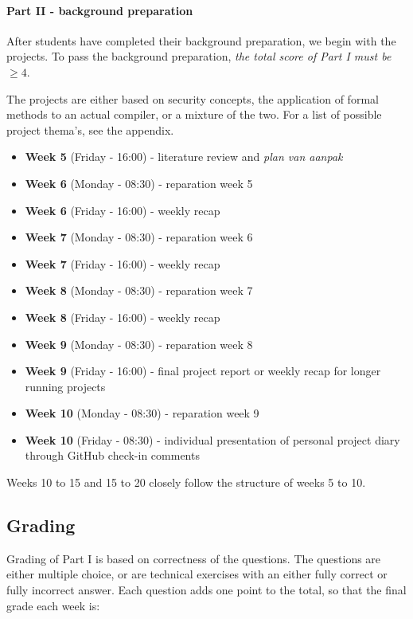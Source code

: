 		\paragraph*{Part II - background preparation}
			After students have completed their background preparation, we begin with the projects. To pass the background preparation, \textit{the total score of Part I must be $\geq 4$}.

			 The projects are either based on security concepts, the application of formal methods to an actual compiler, or a mixture of the two. For a list of possible project thema's, see the appendix.

			\begin{itemize}
				\item \textbf{Week 5} (Friday - 16:00) - literature review and \textit{plan van aanpak}
				\item \textbf{Week 6} (Monday - 08:30) - reparation week 5


				\item \textbf{Week 6} (Friday - 16:00) - weekly recap
				\item \textbf{Week 7} (Monday - 08:30) - reparation week 6

				\item \textbf{Week 7} (Friday - 16:00) - weekly recap
				\item \textbf{Week 8} (Monday - 08:30) - reparation week 7

				\item \textbf{Week 8} (Friday - 16:00) - weekly recap
				\item \textbf{Week 9} (Monday - 08:30) - reparation week 8

				\item \textbf{Week 9} (Friday - 16:00) - final project report or weekly recap for longer running projects
				\item \textbf{Week 10} (Monday - 08:30) - reparation week 9
				\item \textbf{Week 10} (Friday - 08:30) - individual presentation of personal project diary through GitHub check-in comments
			\end{itemize}
		
			Weeks 10 to 15 and 15 to 20 closely follow the structure of weeks 5 to 10.
		

	\subsection{Grading}
		Grading of Part I is based on correctness of the questions. The questions are either multiple choice, or are technical exercises with an either fully correct or fully incorrect answer. Each question adds one point to the total, so that the final grade each week is:
		
